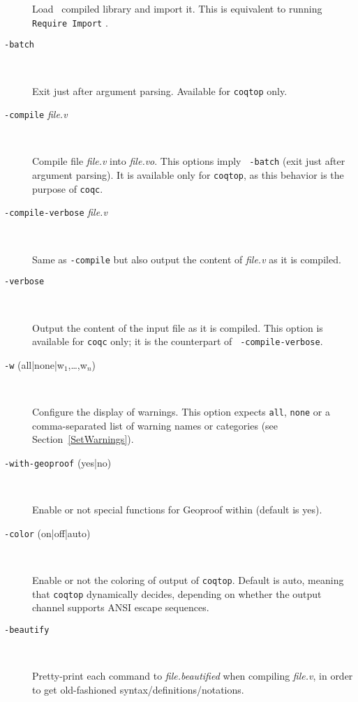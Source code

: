\begin{description}
  Load \Coq~compiled library {\dirpath} and import it. This is equivalent
  to running {\tt Require Import} {\dirpath}.

\item[{\tt -batch}]\ %

  Exit just after argument parsing. Available for {\tt coqtop} only.

\item[{\tt -compile} {\em file.v}]\ %

  Compile file {\em file.v} into {\em file.vo}. This options imply {\tt
    -batch} (exit just after argument parsing). It is available only
  for {\tt coqtop}, as this behavior is the purpose of {\tt coqc}.

\item[{\tt -compile-verbose} {\em file.v}]\ %

  Same as {\tt -compile} but also output the content of {\em file.v} as
  it is compiled.

\item[{\tt -verbose}]\ %

  Output the content of the input file as it is compiled. This option is
  available for {\tt coqc} only; it is the counterpart of {\tt
    -compile-verbose}.

  \item[{\tt -w} (all|none|w$_1$,\ldots,w$_n$)]\ %

  Configure the display of warnings. This option expects {\tt all}, {\tt none}
  or a comma-separated list of warning names or categories (see
  Section~\ref{SetWarnings}).

%

\item[{\tt -with-geoproof} (yes|no)]\ %

  Enable or not special functions for Geoproof within {\CoqIDE} (default
  is yes).

\item[{\tt -color} (on|off|auto)]\ %

  Enable or not the coloring of output of {\tt coqtop}. Default is auto,
  meaning that {\tt coqtop} dynamically decides, depending on whether the
  output channel supports ANSI escape sequences.

\item[{\tt -beautify}]\ %

  Pretty-print each command to {\em file.beautified} when compiling {\em
    file.v}, in order to get old-fashioned syntax/definitions/notations.


\end{description}
